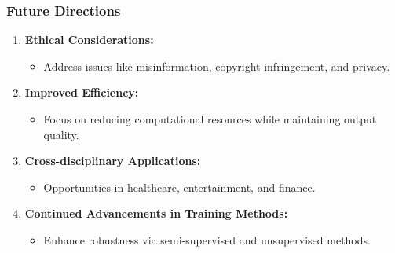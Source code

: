 \documentclass[aspectratio=169]{beamer}
\begin{document}
\begin{frame}[fragile]
    \frametitle{Future Directions}
    \begin{enumerate}
        \item \textbf{Ethical Considerations:}
        \begin{itemize}
            \item Address issues like misinformation, copyright infringement, and privacy.
        \end{itemize}
        \item \textbf{Improved Efficiency:}
        \begin{itemize}
            \item Focus on reducing computational resources while maintaining output quality.
        \end{itemize}
        \item \textbf{Cross-disciplinary Applications:}
        \begin{itemize}
            \item Opportunities in healthcare, entertainment, and finance.
        \end{itemize}
        \item \textbf{Continued Advancements in Training Methods:}
        \begin{itemize}
            \item Enhance robustness via semi-supervised and unsupervised methods.
        \end{itemize}
    \end{enumerate}
\end{frame}
\end{document}
